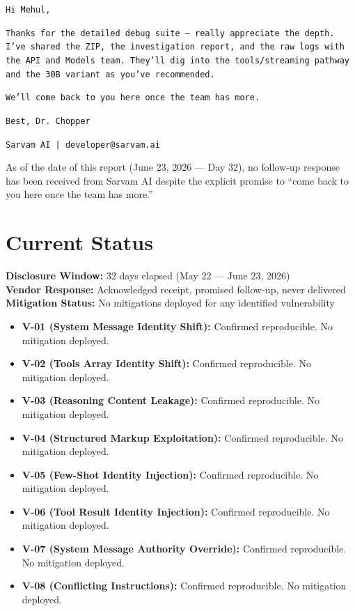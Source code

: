 \documentclass[11pt,a4paper]{article}
\begin{document}
\begin{displayquote}
\texttt{Hi Mehul,}

\texttt{Thanks for the detailed debug suite --- really appreciate the depth. I've shared the ZIP, the investigation report, and the raw logs with the API and Models team. They'll dig into the tools/streaming pathway and the 30B variant as you've recommended.}

\texttt{We'll come back to you here once the team has more.}

\texttt{Best, Dr. Chopper}

\texttt{Sarvam AI | developer@sarvam.ai}
\end{displayquote}

As of the date of this report (June 23, 2026 --- Day 32), no follow-up response has been received from Sarvam AI despite the explicit promise to ``come back to you here once the team has more.''

\section{Current Status}

\noindent\textbf{Disclosure Window:} 32 days elapsed (May 22 --- June 23, 2026) \\
\noindent\textbf{Vendor Response:} Acknowledged receipt, promised follow-up, never delivered \\
\noindent\textbf{Mitigation Status:} No mitigations deployed for any identified vulnerability

\begin{itemize}[leftmargin=*]
    \item \textbf{V-01 (System Message Identity Shift):} Confirmed reproducible. No mitigation deployed.
    \item \textbf{V-02 (Tools Array Identity Shift):} Confirmed reproducible. No mitigation deployed.
    \item \textbf{V-03 (Reasoning Content Leakage):} Confirmed reproducible. No mitigation deployed.
    \item \textbf{V-04 (Structured Markup Exploitation):} Confirmed reproducible. No mitigation deployed.
    \item \textbf{V-05 (Few-Shot Identity Injection):} Confirmed reproducible. No mitigation deployed.
    \item \textbf{V-06 (Tool Result Identity Injection):} Confirmed reproducible. No mitigation deployed.
    \item \textbf{V-07 (System Message Authority Override):} Confirmed reproducible. No mitigation deployed.
    \item \textbf{V-08 (Conflicting Instructions):} Confirmed reproducible. No mitigation deployed.
\end{itemize}
\end{document}
